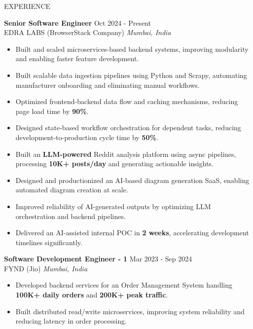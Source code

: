\documentclass{resume}
\begin{document}
\begin{rSection}{EXPERIENCE}

\textbf{Senior Software Engineer} \hfill Oct 2024 - Present\\
EDRA LABS (BrowserStack Company) \hfill \textit{Mumbai, India}
\begin{itemize}

\item Built and scaled microservices-based backend systems, improving modularity and enabling faster feature development.

\item Built scalable data ingestion pipelines using Python and Scrapy, automating manufacturer onboarding and eliminating manual workflows.

\item Optimized frontend-backend data flow and caching mechanisms, reducing page load time by \textbf{90\%}.

\item Designed state-based workflow orchestration for dependent tasks, reducing development-to-production cycle time by \textbf{50\%}.

\item Built an \textbf{LLM-powered} Reddit analysis platform using async pipelines, processing \textbf{10K+ posts/day} and generating actionable insights.

\item Designed and productionized an AI-based diagram generation SaaS, enabling automated diagram creation at scale.

\item Improved reliability of AI-generated outputs by optimizing LLM orchestration and backend pipelines.

\item Delivered an AI-assisted internal POC in \textbf{2 weeks}, accelerating development timelines significantly.

\end{itemize}


\textbf{Software Development Engineer - 1} \hfill Mar 2023 - Sep 2024\\
FYND (Jio) \hfill \textit{Mumbai, India}
\begin{itemize}

\item Developed backend services for an Order Management System handling \textbf{100K+ daily orders} and \textbf{200K+ peak traffic}.

\item Built distributed read/write microservices, improving system reliability and reducing latency in order processing.


\end{itemize}
\end{rSection}
\end{document}
